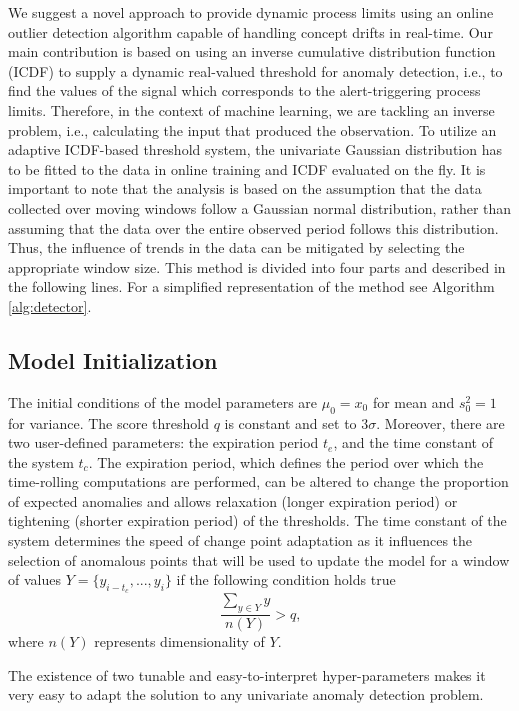 We suggest a novel approach to provide dynamic process limits using an online outlier detection algorithm capable of handling concept drifts in real-time. Our main contribution is based on using an inverse cumulative distribution function (ICDF) to supply a dynamic real-valued threshold for anomaly detection, i.e., to find the values of the signal which corresponds to the alert-triggering process limits. Therefore, in the context of machine learning, we are tackling an inverse problem, i.e., calculating the input that produced the observation. To utilize an adaptive ICDF-based threshold system, the univariate Gaussian distribution has to be fitted to the data in online training and ICDF evaluated on the fly. It is important to note that the analysis is based on the assumption that the data collected over moving windows follow a Gaussian normal distribution, rather than assuming that the data over the entire observed period follows this distribution. Thus, the influence of trends in the data can be mitigated by selecting the appropriate window size. 
This method is divided into four parts and described in the following lines. For a simplified representation of the method see Algorithm \ref{alg:detector}.

\subsection{Model Initialization}\label{init}
The initial conditions of the model parameters are \(\mu_0 = x_0\) for mean and \(s^2_0 = 1\) for variance. The score threshold $q$ is constant and set to $3\sigma$. Moreover, there are two user-defined parameters: the expiration period $t_e$, and the time constant of the system $t_c$. The expiration period, which defines the period over which the time-rolling computations are performed, can be altered to change the proportion of expected anomalies and allows relaxation (longer expiration period) or tightening (shorter expiration period) of the thresholds. The time constant of the system determines the speed of change point adaptation as it influences the selection of anomalous points that will be used to update the model for a window of values \(Y=\{y_{i-t_c},...,y_{i}\}\) if the following condition holds true
\begin{equation}
{\frac{\sum_{y\in Y}y}{n(Y)}} > q\text{,}\label{eq:condition}
\end{equation}
where \(n(Y)\) represents dimensionality of \(Y\).

The existence of two tunable and easy-to-interpret hyper-parameters makes it very easy to adapt the solution to any univariate anomaly detection problem.


